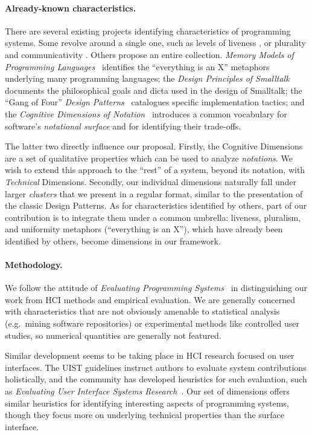 \paragraph{Already-known characteristics.}

There are several existing projects identifying characteristics of
programming systems. Some revolve around a single one, such as levels of
liveness \cite{Liveness}, or plurality and communicativity
\cite{KellComm}. Others propose an entire collection. \emph{Memory
Models of Programming Languages}~\cite{MemMod} identifies the
``everything is an X'' metaphors underlying many programming languages;
the \emph{Design Principles of Smalltalk}~\cite{STdesign} documents the
philosophical goals and dicta used in the design of Smalltalk; the
``Gang of Four'' \emph{Design Patterns}~\cite{DesPats} catalogues
specific implementation tactics; and the \emph{Cognitive Dimensions of
Notation}~\cite{CogDims} introduces a common vocabulary for software's
\emph{notational surface} and for identifying their trade-offs.

The latter two directly influence our proposal. Firstly, the Cognitive
Dimensions are a set of qualitative properties which can be used to
analyze \emph{notations}. We wish to extend this approach to the
``rest'' of a system, beyond its notation, with \emph{Technical}
Dimensions. Secondly, our individual dimensions naturally fall under
larger \emph{clusters} that we present in a regular format, similar to
the presentation of the classic Design Patterns. As for characteristics
identified by others, part of our contribution is to integrate them
under a common umbrella: liveness, pluralism, and uniformity metaphors
(``everything is an X''), which have already been identified by others,
become dimensions in our framework.

\paragraph{Methodology.}

We follow the attitude of \emph{Evaluating Programming
Systems}~\cite{EvProgSys} in distinguishing our work from HCI methods
and empirical evaluation. We are generally concerned with
characteristics that are not obviously amenable to statistical analysis
(e.g.~mining software repositories) or experimental methods like
controlled user studies, so numerical quantities are generally not
featured.

Similar development seems to be taking place in HCI research focused on
user interfaces. The UIST guidelines \cite{UISTAuthor} instruct authors
to evaluate system contributions holistically, and the community has
developed heuristics for such evaluation, such as \emph{Evaluating User
Interface Systems Research}~\cite{EvUISR}. Our set of dimensions offers
similar heuristics for identifying interesting aspects of programming
systems, though they focus more on underlying technical properties than
the surface interface.

